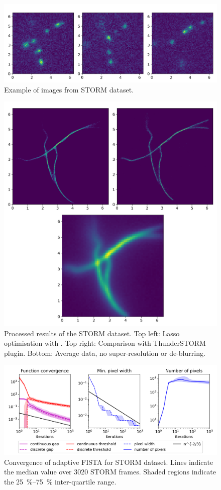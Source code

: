 \documentclass[10pt,a4paper,onecolumn]{article}
\numberwithin{equation}{section}
\begin{document}
\begin{figure}\centering
	\includegraphics[width=.8\textwidth]{STORM_data}
	\caption{Example of images from STORM dataset.}\label{fig:ca: STORM data}
\end{figure}
\begin{figure}\centering
	\includegraphics[width=.77\textwidth]{STORM_recon}
	\caption{Processed results of the STORM dataset. Top left: Lasso optimisation with . Top right: Comparison with ThunderSTORM plugin. Bottom: Average data, no super-resolution or de-blurring.}\label{fig:ca: STORM results}
\end{figure}
\begin{figure}\centering
	\includegraphics[width=\textwidth]{lasso2_convergence}
	\caption{Convergence of adaptive FISTA for STORM dataset. Lines indicate the median value over 3020 STORM frames. Shaded regions indicate the \SIrange{25}{75}{\percent} inter-quartile range.}\label{fig:ca: STORM convergence}
\end{figure}
\end{document}
